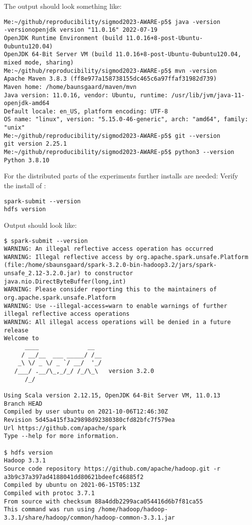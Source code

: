\documentclass{readme}
\begin{document}
The output should look something like:

\begin{lstlisting}
Me:~/github/reproducibility/sigmod2023-AWARE-p5$ java -version
-versionopenjdk version "11.0.16" 2022-07-19
OpenJDK Runtime Environment (build 11.0.16+8-post-Ubuntu-0ubuntu120.04)
OpenJDK 64-Bit Server VM (build 11.0.16+8-post-Ubuntu-0ubuntu120.04, mixed mode, sharing)
Me:~/github/reproducibility/sigmod2023-AWARE-p5$ mvn -version
Apache Maven 3.8.3 (ff8e977a158738155dc465c6a97ffaf31982d739)
Maven home: /home/baunsgaard/maven/mvn
Java version: 11.0.16, vendor: Ubuntu, runtime: /usr/lib/jvm/java-11-openjdk-amd64
Default locale: en_US, platform encoding: UTF-8
OS name: "linux", version: "5.15.0-46-generic", arch: "amd64", family: "unix"
Me:~/github/reproducibility/sigmod2023-AWARE-p5$ git --version
git version 2.25.1
Me:~/github/reproducibility/sigmod2023-AWARE-p5$ python3 --version
Python 3.8.10
\end{lstlisting}

For the distributed parts of the experiments further installs are needed:
Verify the install of :

\begin{lstlisting}
spark-submit --version
hdfs version
\end{lstlisting}
    

Output should look like:

\begin{lstlisting}
$ spark-submit --version
WARNING: An illegal reflective access operation has occurred
WARNING: Illegal reflective access by org.apache.spark.unsafe.Platform (file:/home/sbaunsgaard/spark-3.2.0-bin-hadoop3.2/jars/spark-unsafe_2.12-3.2.0.jar) to constructor java.nio.DirectByteBuffer(long,int)
WARNING: Please consider reporting this to the maintainers of org.apache.spark.unsafe.Platform
WARNING: Use --illegal-access=warn to enable warnings of further illegal reflective access operations
WARNING: All illegal access operations will be denied in a future release
Welcome to
      ____              __
     / __/__  ___ _____/ /__
    _\ \/ _ \/ _ `/ __/  '_/
   /___/ .__/\_,_/_/ /_/\_\   version 3.2.0
      /_/
                        
Using Scala version 2.12.15, OpenJDK 64-Bit Server VM, 11.0.13
Branch HEAD
Compiled by user ubuntu on 2021-10-06T12:46:30Z
Revision 5d45a415f3a29898d92380380cfd82bfc7f579ea
Url https://github.com/apache/spark
Type --help for more information.

$ hdfs version
Hadoop 3.3.1
Source code repository https://github.com/apache/hadoop.git -r a3b9c37a397ad4188041dd80621bdeefc46885f2
Compiled by ubuntu on 2021-06-15T05:13Z
Compiled with protoc 3.7.1
From source with checksum 88a4ddb2299aca054416d6b7f81ca55
This command was run using /home/hadoop/hadoop-3.3.1/share/hadoop/common/hadoop-common-3.3.1.jar
\end{lstlisting}
\end{document}
